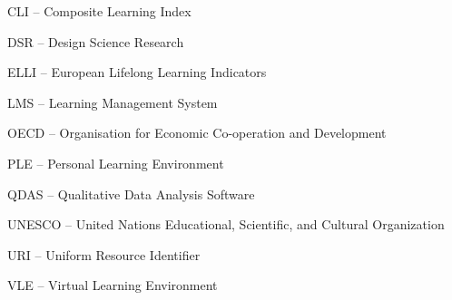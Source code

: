 CLI -- Composite Learning Index

DSR -- Design Science Research

ELLI -- European Lifelong Learning Indicators

LMS -- Learning Management System

OECD -- Organisation for Economic Co-operation and Development

PLE -- Personal Learning Environment

QDAS -- Qualitative Data Analysis Software

UNESCO -- United Nations Educational, Scientific, and Cultural Organization

URI -- Uniform Resource Identifier

VLE -- Virtual Learning Environment





